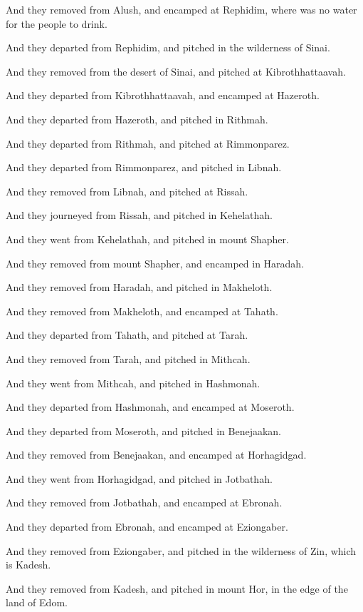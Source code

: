 \verse And they removed from Alush, and encamped at Rephidim, where was
no water for the people to drink.

\verse And they departed from Rephidim, and pitched in the wilderness
of Sinai.

\verse And they removed from the desert of Sinai, and pitched at
Kibrothhattaavah.

\verse And they departed from Kibrothhattaavah, and encamped at
Hazeroth.

\verse And they departed from Hazeroth, and pitched in Rithmah.

\verse And they departed from Rithmah, and pitched at Rimmonparez.

\verse And they departed from Rimmonparez, and pitched in Libnah.

\verse And they removed from Libnah, and pitched at Rissah.

\verse And they journeyed from Rissah, and pitched in Kehelathah.

\verse And they went from Kehelathah, and pitched in mount Shapher.

\verse And they removed from mount Shapher, and encamped in Haradah.

\verse And they removed from Haradah, and pitched in Makheloth.

\verse And they removed from Makheloth, and encamped at Tahath.

\verse And they departed from Tahath, and pitched at Tarah.

\verse And they removed from Tarah, and pitched in Mithcah.

\verse And they went from Mithcah, and pitched in Hashmonah.

\verse And they departed from Hashmonah, and encamped at Moseroth.

\verse And they departed from Moseroth, and pitched in Benejaakan.

\verse And they removed from Benejaakan, and encamped at Horhagidgad.

\verse And they went from Horhagidgad, and pitched in Jotbathah.

\verse And they removed from Jotbathah, and encamped at Ebronah.

\verse And they departed from Ebronah, and encamped at Eziongaber.

\verse And they removed from Eziongaber, and pitched in the wilderness
of Zin, which is Kadesh.

\verse And they removed from Kadesh, and pitched in mount Hor, in the
edge of the land of Edom.


